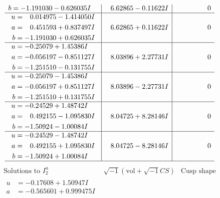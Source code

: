 \documentclass[1p]{elsarticle_modified}
\theoremstyle{definition}
\newcommand{\I}{\sqrt{-1}}
\begin{document}
$$\begin{array}{c|c|c}
\begin{aligned}
b &= -1.191030 - 0.626035 I\end{aligned}
 & \phantom{-}6.62865 - 0.11622 I & \phantom{-0.000000 } 0 \\ \hline\begin{aligned}
u &= \phantom{-}0.014975 - 1.414050 I \\
a &= \phantom{-}0.451593 + 0.837497 I \\
b &= -1.191030 + 0.626035 I\end{aligned}
 & \phantom{-}6.62865 + 0.11622 I & \phantom{-0.000000 } 0 \\ \hline\begin{aligned}
u &= -0.25079 + 1.45386 I \\
a &= -0.056197 - 0.851127 I \\
b &= -1.251510 - 0.131755 I\end{aligned}
 & \phantom{-}8.03896 + 2.27731 I & \phantom{-0.000000 } 0 \\ \hline\begin{aligned}
u &= -0.25079 - 1.45386 I \\
a &= -0.056197 + 0.851127 I \\
b &= -1.251510 + 0.131755 I\end{aligned}
 & \phantom{-}8.03896 - 2.27731 I & \phantom{-0.000000 } 0 \\ \hline\begin{aligned}
u &= -0.24529 + 1.48742 I \\
a &= \phantom{-}0.492155 - 1.095830 I \\
b &= -1.50924 - 1.00084 I\end{aligned}
 & \phantom{-}8.04725 + 8.28146 I & \phantom{-0.000000 } 0 \\ \hline\begin{aligned}
u &= -0.24529 - 1.48742 I \\
a &= \phantom{-}0.492155 + 1.095830 I \\
b &= -1.50924 + 1.00084 I\end{aligned}
 & \phantom{-}8.04725 - 8.28146 I & \phantom{-0.000000 } 0\\
 \hline 
 \end{array}$$\newpage$$\begin{array}{c|c|c}  
\text{Solutions to }I^u_{2}& \I (\text{vol} + \sqrt{-1}CS) & \text{Cusp shape}\\
 \hline 
\begin{aligned}
u &= -0.17608 + 1.50947 I \\
a &= -0.565601 + 0.999475 I \\

\end{aligned}
\end{array}$$
\end{document}
